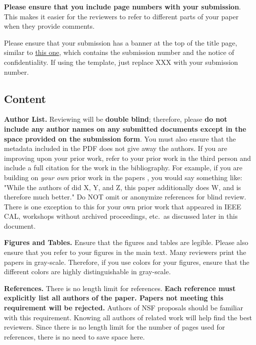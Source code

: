 \documentclass[pageno]{jpaper}
\begin{document}
\textbf{Please ensure that you include page numbers with your
submission}. This makes it easier for the reviewers to refer to different
parts of your paper when they provide comments.

Please ensure that your submission has a banner at the top of the title
page, similar to
\href{http://novel.ict.ac.cn/ASPLOS2017/files/asplos17-template.pdf}{this
one}, which contains the submission number and the notice of
confidentiality.  If using the template, just replace XXX with your
submission number.

\subsection{Content}

\noindent\textbf{Author List.}  Reviewing will be \textbf{double blind};
therefore, please \textbf{do not include any author names on any submitted
documents except in the space provided on the submission form}.  You must
also ensure that the metadata included in the PDF does not give away the
authors. If you are improving upon your prior work, refer to your prior
work in the third person and include a full citation for the work in the
bibliography.  For example, if you are building on {\em your own} prior
work in the papers \cite{nicepaper1,nicepaper2,nicepaper3}, you would say
something like: "While the authors of
\cite{nicepaper1,nicepaper2,nicepaper3} did X, Y, and Z, this paper
additionally does W, and is therefore much better."  Do NOT omit or
anonymize references for blind review.  There is one exception to this for
your own prior work that appeared in IEEE CAL, workshops without archived
proceedings, etc.\, as discussed later in this document.

\noindent\textbf{Figures and Tables.} Ensure that the figures and tables
are legible.  Please also ensure that you refer to your figures in the main
text.  Many reviewers print the papers in gray-scale. Therefore, if you use
colors for your figures, ensure that the different colors are highly
distinguishable in gray-scale.

\noindent\textbf{References.}  There is no length limit for references.
{\bf Each reference must explicitly list all authors of the paper.  Papers
not meeting this requirement will be rejected.} Authors of NSF proposals
should be familiar with this requirement. Knowing all authors of related
work will help find the best reviewers. Since there is no length limit 
for the number of pages used for references, there is no need to save space 
here. 
\end{document}
